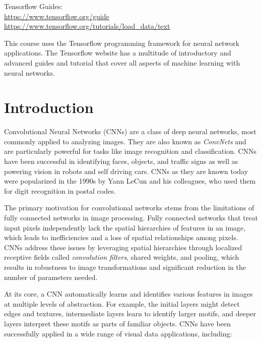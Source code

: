 \begin{tcolorbox}[colback=alert]
Tensorflow Guides: \\
\url{https://www.tensorflow.org/guide} \\
\url{https://www.tensorflow.org/tutorials/load_data/text}
\end{tcolorbox}

This course uses the Tensorflow programming framework for neural network applications. The Tensorflow website has a multitude of introductory and advanced guides and tutorial that cover all aspects of machine learning with neural networks. 

\section{Introduction}

Convolutional Neural Networks (CNNs) are a class of deep neural networks, most commonly applied to analyzing images. They are also known as \emph{ConvNets} and are particularly powerful for tasks like image recognition and classification. CNNs have been successful in identifying faces, objects, and traffic signs as well as powering vision in robots and self driving cars. CNNs as they are known today were popularized in the 1990s by Yann LeCun and his colleagues, who used them for digit recognition in postal codes. 

The primary motivation for convolutional networks stems from the limitations of fully connected networks in image processing. Fully connected networks that treat input pixels independently lack the spatial hierarchies of features in an image, which leads to inefficiencies and a loss of spatial relationships among pixels. CNNs address these issues by leveraging spatial hierarchies through localized receptive fields called \emph{convolution filters}, shared weights, and pooling, which results in robustness to image transformations and significant reduction in the number of parameters needed.

At its core, a CNN automatically learns and identifies various features in images at multiple levels of abstraction. For example, the initial layers might detect edges and textures, intermediate layers learn to identify larger motifs, and deeper layers interpret these motifs as parts of familiar objects. CNNs have been successfully applied in a wide range of visual data applications, including:

